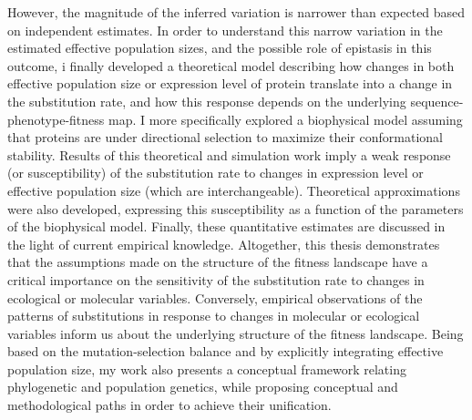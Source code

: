 However, the magnitude of the inferred variation is narrower than expected based on independent estimates.
In order to understand this narrow variation in the estimated effective population sizes, and the possible role of epistasis in this outcome, i finally developed a theoretical model describing how changes in both effective population size or expression level of protein translate into a change in the substitution rate, and how this response depends on the underlying sequence-phenotype-fitness map.
I more specifically explored a biophysical model assuming that proteins are under directional selection to maximize their conformational stability.
Results of this theoretical and simulation work imply a weak response (or susceptibility) of the substitution rate to changes in expression level or effective population size (which are interchangeable).
Theoretical approximations were also developed, expressing this susceptibility as a function of the parameters of the biophysical model.
Finally, these quantitative estimates are discussed in the light of current empirical knowledge.
Altogether, this thesis demonstrates that the assumptions made on the structure of the fitness landscape have a critical importance on the sensitivity of the substitution rate to changes in ecological or molecular variables.
Conversely, empirical observations of the patterns of substitutions in response to changes in molecular or ecological variables inform us about the underlying structure of the fitness landscape.
Being based on the mutation-selection balance and by explicitly integrating effective population size, my work also presents a conceptual framework relating phylogenetic and population genetics, while proposing conceptual and methodological paths in order to achieve their unification.

